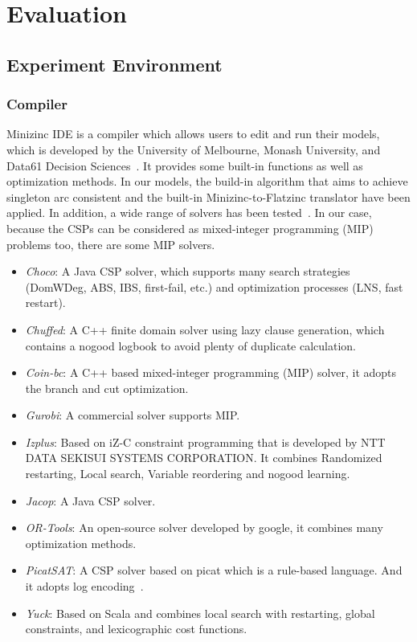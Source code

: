 \chapter{Evaluation}
\label{cha:evaluation}
\section{Experiment Environment}
\subsection{Compiler}
\label{section:compiler}
Minizinc IDE is a compiler which allows users to edit and run their models, which is developed by the University of Melbourne, Monash University, and Data61 Decision Sciences~\cite{r6}. It provides some built-in functions as well as optimization methods. In our models, the build-in algorithm that aims to achieve singleton arc consistent and the built-in Minizinc-to-Flatzinc translator have been applied. In addition, a wide range of solvers has been tested~\cite{r6}. In our case, because the CSPs can be considered as mixed-integer programming (MIP) problems too, there are some MIP solvers.
\begin{itemize}
    \item \emph{Choco}: A Java CSP solver, which supports many search strategies (DomWDeg, ABS, IBS, first-fail, etc.) and optimization processes (LNS, fast restart).
    \item \emph{Chuffed}: A C++ finite domain solver using lazy clause generation, which contains a nogood logbook to avoid plenty of duplicate calculation.
    \item \emph{Coin-bc}: A C++ based mixed-integer programming (MIP) solver, it adopts the branch and cut optimization.
    \item \emph{Gurobi}: A commercial solver supports MIP.
    \item \emph{Izplus}: Based on iZ-C constraint programming that is developed by NTT DATA SEKISUI SYSTEMS CORPORATION. It combines Randomized restarting, Local search, Variable reordering and nogood learning.
    \item \emph{Jacop}: A Java CSP solver.
    \item \emph{OR-Tools}: An open-source solver developed by google, it combines many optimization methods.
    \item \emph{PicatSAT}: A CSP solver based on picat which is a rule-based language. And it adopts log encoding~\cite{r8}.
    \item \emph{Yuck}: Based on Scala and combines local search with restarting, global constraints, and lexicographic cost functions.
\end{itemize}
